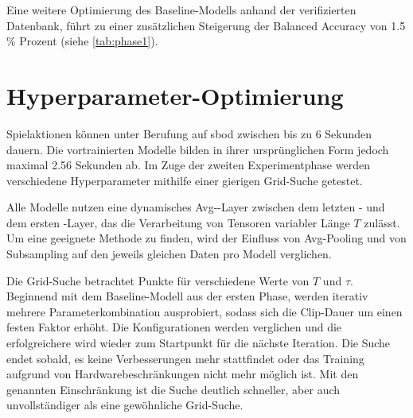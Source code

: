 Eine weitere Optimierung des Baseline-Modells anhand der verifizierten Datenbank, führt zu einer zusätzlichen Steigerung der Balanced Accuracy von 1.5 \% Prozent (siehe \autoref{tab:phase1}).

\section{Hyperparameter-Optimierung}
\label{sec:hyperparameter-optimierung}

Spielaktionen können unter Berufung auf \gls{sbod} zwischen bis zu 6 Sekunden dauern.
Die vortrainierten Modelle bilden in ihrer ursprünglichen Form jedoch maximal 2.56 Sekunden ab.
Im Zuge der zweiten Experimentphase werden verschiedene Hyperparameter mithilfe einer gierigen Grid-Suche getestet.

Alle Modelle nutzen eine dynamisches Avg-\pool-Layer zwischen dem letzten \conv- und dem ersten \fc-Layer, das die Verarbeitung von Tensoren variabler Länge $T$ zulässt.
Um eine geeignete Methode zu finden, wird der Einfluss von Avg-Pooling und von Subsampling auf den jeweils gleichen Daten pro Modell verglichen.

Die Grid-Suche betrachtet Punkte für verschiedene Werte von $T$ und $\tau$.
Beginnend mit dem Baseline-Modell aus der ersten Phase, werden iterativ mehrere Parameterkombination ausprobiert, sodass sich die Clip-Dauer um einen festen Faktor erhöht.
Die Konfigurationen werden verglichen und die erfolgreichere wird wieder zum Startpunkt für die nächste Iteration.
Die Suche endet sobald, es keine Verbesserungen mehr stattfindet oder das Training aufgrund von Hardwarebeschränkungen nicht mehr möglich ist.
Mit den genannten Einschränkung ist die Suche deutlich schneller, aber auch unvollständiger als eine gewöhnliche Grid-Suche.

